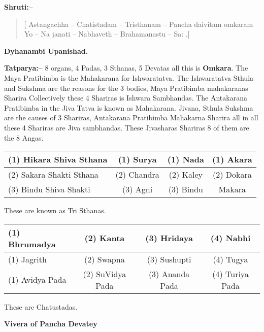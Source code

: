 \textbf{Shruti:–}

\begin{verse}
[ Astangachha – Chatistadam – Tristhanam – Pancha daivitam  omkaram Yo – Na janati – Nabhaveth – Brahamanastu – Sa: .]
\end{verse}

\begin{flushright}
\textbf{Dyhanambi Upanishad.}
\end{flushright}

\textbf{Tatparya:–} 8 organs, 4 Padas, 3 Sthanas, 5 Devatas all this is \textbf{Omkara}. The Maya Pratibimba is the Mahakarana for Ishwaratatva. The Ishwaratatva Sthula and Sukshma are the reasons for the 3 bodies, Maya Pratibimba mahakaranas Sharira Collectively these 4 Shariras is Ishwara Sambhandas. The Antakarana Pratibimba in the Jiva Tatva is known as Mahakarana. Jivana, Sthula Sukshma are the causes of 3 Shariras, Antakarana Pratibimba Mahakarna Sharira all in all these 4 Shariras are Jiva sambhandas. These Jivasharas Shariras 8 of them are the 8 Angas.

\begin{table}[H]
\caption{\textbf{Tristhana Vivara}}
\begin{longtable}{@{}|l|c|c|c|@{}}
\hline
(1) Hikara Shiva Sthana & (1) Surya & (1) Nada & (1) Akara \\
\hline
(2) Sakara Shakti Sthana & (2) Chandra & (2) Kaley & (2) Dokara \\
\hline
(3) Bindu Shiva Shakti & (3) Agni & (3) Bindu & Makara \\
\hline
\end{longtable}
\end{table}

These are known as Tri Sthanas.

\begin{table}[H]
\caption{\textbf{Chatustada Vivara}}
\begin{longtable}{@{}|l|c|c|c|@{}}
\hline
(1) Bhrumadya & (2) Kanta & (3) Hridaya & (4) Nabhi \\
\hline
(1) Jagrith & (2) Swapna & (3) Sushupti & (4) Tugya \\
\hline
(1) Avidya Pada & (2) SuVidya Pada & (3) Ananda Pada & (4) Turiya Pada \\
\hline
\end{longtable}
\end{table}

These are Chatustadas.

\begin{center}
\textbf{Vivera of Pancha Devatey}
\end{center}

